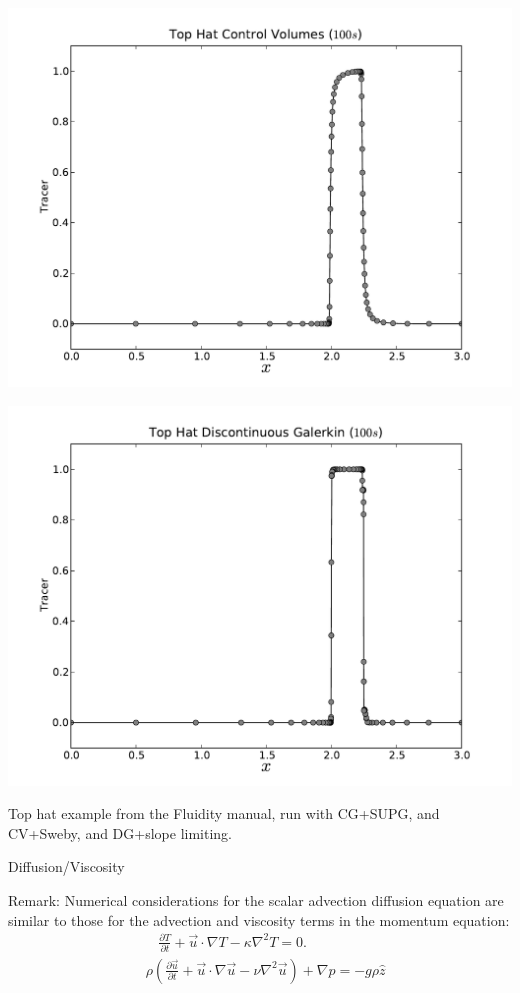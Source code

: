 \documentclass[12pt]{beamer}
\newcommand\pp[2]{\frac{\partial #1}{\partial #2}}
\newcommand\ppt[1]{\pp{#1}t}
\newcommand\grad\nabla
\begin{document}
\begin{frame}
  \vspace{-1em}
  \begin{minipage}{0.5\textwidth}
    \includegraphics[width=\textwidth]{top_hat_cv}
  \end{minipage}%
  \begin{minipage}{0.5\textwidth}
    \includegraphics[width=\textwidth]{top_hat_dg}
  \end{minipage}
  \small Top hat example from the Fluidity manual, run with CG+SUPG, 
  and CV+Sweby, and DG+slope limiting.
\end{frame}

\begin{frame}{Diffusion/Viscosity}
  \begin{exampleblock}{Remark:}
    Numerical considerations for the scalar advection diffusion equation are 
    similar to those for the advection and viscosity terms in the momentum equation:
    \begin{align*}
      &\phantom{\rho\big(}\ppt T + \vec u\cdot\grad T - \kappa \nabla^2 T
      = 0. \\
      &\rho\left(\ppt{\vec u} + \vec u\cdot\grad\vec u - \nu \nabla^2 \vec u
      \right)
      + \grad p = -g \rho \hat z 
    \end{align*}
  \end{exampleblock}
\end{frame}
\end{document}
